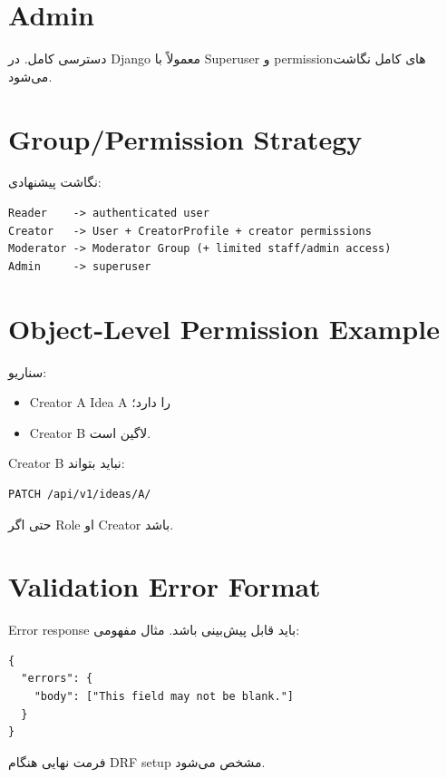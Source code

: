 \section{Admin}

دسترسی کامل. در Django معمولاً با Superuser و permissionهای کامل نگاشت می‌شود.

\section{Group/Permission Strategy}

نگاشت پیشنهادی:
\begin{latin}
\begin{lstlisting}
Reader    -> authenticated user
Creator   -> User + CreatorProfile + creator permissions
Moderator -> Moderator Group (+ limited staff/admin access)
Admin     -> superuser
\end{lstlisting}
\end{latin}

\section{Object-Level Permission Example}

سناریو:
\begin{itemize}
  \item Creator A Idea A را دارد؛
  \item Creator B لاگین است.
\end{itemize}

Creator B نباید بتواند:
\begin{latin}
\begin{lstlisting}
PATCH /api/v1/ideas/A/
\end{lstlisting}
\end{latin}

حتی اگر Role او Creator باشد.

\section{Validation Error Format}

Error response باید قابل پیش‌بینی باشد. مثال مفهومی:
\begin{latin}
\begin{lstlisting}
{
  "errors": {
    "body": ["This field may not be blank."]
  }
}
\end{lstlisting}
\end{latin}

فرمت نهایی هنگام DRF setup مشخص می‌شود.

